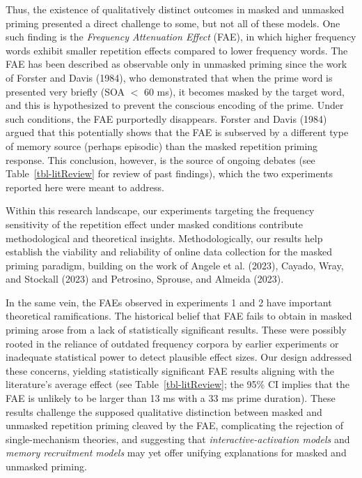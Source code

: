 \documentclass[
]{interact}
\begin{document}
Thus, the existence of qualitatively distinct outcomes in masked and
unmasked priming presented a direct challenge to some, but not all of
these models. One such finding is the \emph{Frequency Attenuation
Effect} (FAE), in which higher frequency words exhibit smaller
repetition effects compared to lower frequency words. The FAE has been
described as observable only in unmasked priming since the work of
Forster and Davis (1984), who demonstrated that when the prime word is
presented very briefly (SOA \(<\) 60 ms), it becomes masked by the
target word, and this is hypothesized to prevent the conscious encoding
of the prime. Under such conditions, the FAE purportedly disappears.
Forster and Davis (1984) argued that this potentially shows that the FAE
is subserved by a different type of memory source (perhaps episodic)
than the masked repetition priming response. This conclusion, however,
is the source of ongoing debates (see Table~\ref{tbl-litReview} for
review of past findings), which the two experiments reported here were
meant to address.

Within this research landscape, our experiments targeting the frequency
sensitivity of the repetition effect under masked conditions contribute
methodological and theoretical insights. Methodologically, our results
help establish the viability and reliability of online data collection
for the masked priming paradigm, building on the work of Angele et al.
(2023), Cayado, Wray, and Stockall (2023) and Petrosino, Sprouse, and
Almeida (2023).

In the same vein, the FAEs observed in experiments 1 and 2 have
important theoretical ramifications. The historical belief that FAE
fails to obtain in masked priming arose from a lack of statistically
significant results. These were possibly rooted in the reliance of
outdated frequency corpora by earlier experiments or inadequate
statistical power to detect plausible effect sizes. Our design addressed
these concerns, yielding statistically significant FAE results aligning
with the literature's average effect (see Table~\ref{tbl-litReview}; the
95\% CI implies that the FAE is unlikely to be larger than 13 ms with a
33 ms prime duration). These results challenge the supposed qualitative
distinction between masked and unmasked repetition priming cleaved by
the FAE, complicating the rejection of single-mechanism theories, and
suggesting that \emph{interactive-activation models} and \emph{memory
recruitment models} may yet offer unifying explanations for masked and
unmasked priming.
\end{document}
